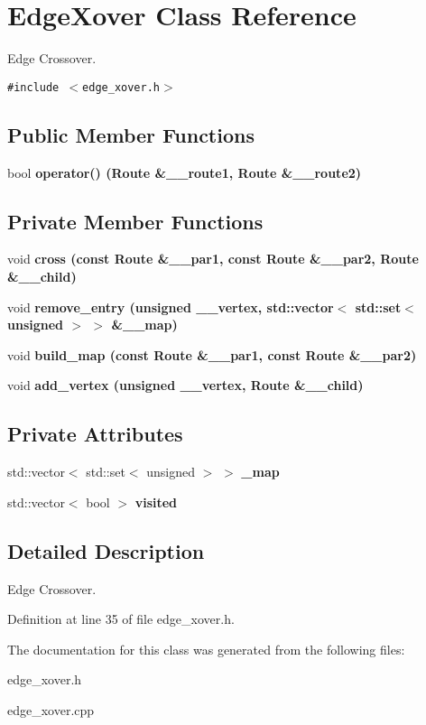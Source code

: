 \section{Edge\-Xover Class Reference}
\label{class_edge_xover}
Edge Crossover.  


{\tt \#include $<$edge\_\-xover.h$>$}

\subsection*{Public Member Functions}
\begin{CompactItemize}
\item 
bool \bf{operator()} (Route \&\_\-\_\-route1, Route \&\_\-\_\-route2)\label{class_edge_xover_cb1c0a103106a4d3319540cb23163a79}

\end{CompactItemize}
\subsection*{Private Member Functions}
\begin{CompactItemize}
\item 
void \bf{cross} (const Route \&\_\-\_\-par1, const Route \&\_\-\_\-par2, Route \&\_\-\_\-child)\label{class_edge_xover_88c2d4c9a878454a32d56010f3dddc27}

\item 
void \bf{remove\_\-entry} (unsigned \_\-\_\-vertex, std::vector$<$ std::set$<$ unsigned $>$ $>$ \&\_\-\_\-map)\label{class_edge_xover_1b3a4c75dd9a034c81af6d89d85d30f5}

\item 
void \bf{build\_\-map} (const Route \&\_\-\_\-par1, const Route \&\_\-\_\-par2)\label{class_edge_xover_04de96aa1016836e0ba5f4b952a5fa16}

\item 
void \bf{add\_\-vertex} (unsigned \_\-\_\-vertex, Route \&\_\-\_\-child)\label{class_edge_xover_2d3045ef503d8b16a27e11fdc23ca11c}

\end{CompactItemize}
\subsection*{Private Attributes}
\begin{CompactItemize}
\item 
std::vector$<$ std::set$<$ unsigned $>$ $>$ \bf{\_\-map}\label{class_edge_xover_d41399c6effb54ee48c722f1e19cb3c3}

\item 
std::vector$<$ bool $>$ \bf{visited}\label{class_edge_xover_46d4d4724cf6d660b1a7ab4a346573d4}

\end{CompactItemize}


\subsection{Detailed Description}
Edge Crossover. 



Definition at line 35 of file edge\_\-xover.h.

The documentation for this class was generated from the following files:\begin{CompactItemize}
\item 
edge\_\-xover.h\item 
edge\_\-xover.cpp\end{CompactItemize}
